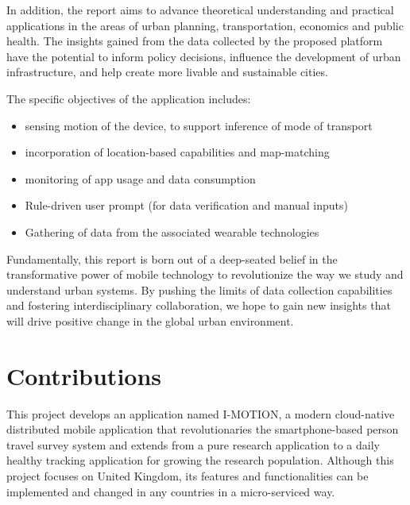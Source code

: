 \documentclass[12pt,two side]{report}
\begin{document}
In addition, the report aims to advance theoretical understanding and practical applications in the areas of urban planning, transportation, economics and public health. The insights gained from the data collected by the proposed platform have the potential to inform policy decisions, influence the development of urban infrastructure, and help create more livable and sustainable cities.\newline

The specific objectives of the application includes:
\begin{itemize}
  \item sensing motion of the device, to support inference of mode of transport
  \item incorporation of location-based capabilities and map-matching
  \item monitoring of app usage and data consumption
  \item Rule-driven user prompt (for data verification and manual inputs)
  \item Gathering of data from the associated wearable technologies
\end{itemize}
Fundamentally, this report is born out of a deep-seated belief in the transformative power of mobile technology to revolutionize the way we study and understand urban systems. By pushing the limits of data collection capabilities and fostering interdisciplinary collaboration, we hope to gain new insights that will drive positive change in the global urban environment.
\section{Contributions}
This project develops an application named I-MOTION, a modern cloud-native distributed mobile application that revolutionaries the smartphone-based person travel survey system and extends from a pure research application to a daily healthy tracking application for growing the research population. Although this project focuses on United Kingdom, its features and functionalities can be implemented and changed in any countries in a micro-serviced way.\newline
\end{document}
